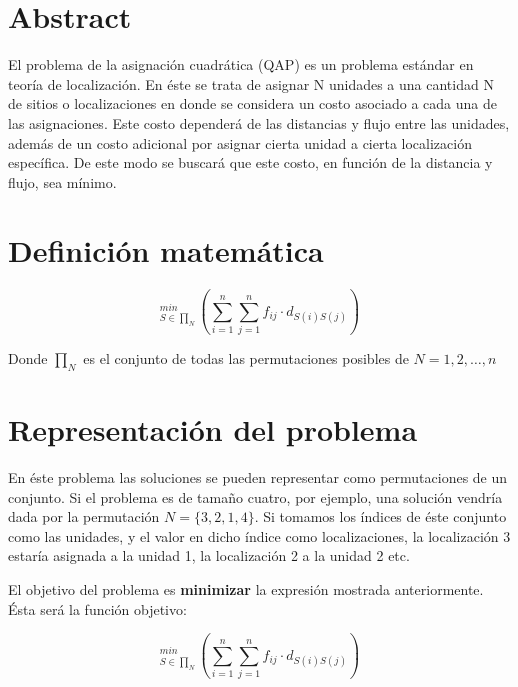 \documentclass[10pt,a4paper]{article}
\author{%
    \href{http://elbauldelprogramador.com}{Alejandro Alcalde Barros}\\%
    \vspace{20pt}
    }
\makeatletter
\def\printtitle{%
    {\color{bl} \centering \huge \sc \textbf{\@title}\par}}     %
\def\printauthor{%
    {\centering \small \@author}}               %
\makeatother
\begin{document}
\thispagestyle{empty}

\titleBC
\newpage
\tableofcontents
\newpage

\section{Abstract}

El problema de la asignación cuadrática (QAP) es un problema estándar en teoría de localización. En éste se trata de asignar N unidades a una cantidad N de sitios o localizaciones en donde se considera un costo asociado a cada una de las asignaciones. Este costo dependerá de las distancias y flujo entre las unidades, además de un costo adicional por asignar cierta unidad a cierta localización específica. De este modo se buscará que este costo, en función de la distancia y flujo, sea mínimo.

\section{Definición matemática}
      
\begin{displaymath}
_{S\in\prod _N}^{min}\left ( \sum_{i=1}^n \sum_{j=1}^n f_{ij} \cdot d_{S(i)S(j)}  \right )
\end{displaymath} 

Donde $\prod _N$ es el conjunto de todas las permutaciones posibles de $N={1,2,\dots,n}$

\section{Representación del problema}

En éste problema las soluciones se pueden representar como permutaciones de un conjunto. Si el problema es de tamaño cuatro, por ejemplo, una solución vendría dada por la permutación $N=\{3,2,1,4\}$. Si tomamos los índices de éste conjunto como las unidades, y el valor en dicho índice como localizaciones, la localización 3 estaría asignada a la unidad 1, la localización 2 a la unidad 2 etc.

El objetivo del problema es \textbf{minimizar} la expresión mostrada anteriormente. Ésta será la función objetivo:

\begin{displaymath}
_{S\in\prod _N}^{min}\left ( \sum_{i=1}^n \sum_{j=1}^n f_{ij} \cdot d_{S(i)S(j)}  \right )
\end{displaymath} 
\end{document}

